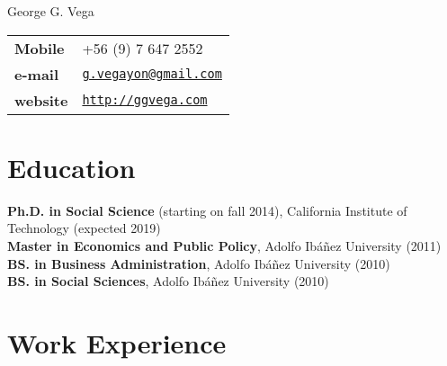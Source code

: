 \documentclass[letterpaper, 11pt]{article}
\def\name{George G. Vega}
\renewenvironment{itemize}{
  \begin{list}{}{
    \setlength{\leftmargin}{0.45cm}
  }
}{
  \end{list}
}
\begin{document}
{\huge \name}


\vspace{0.25in}

\begin{minipage}{0.45\linewidth}
  \begin{tabular}{>{\bfseries}p{4cm}l}
    Mobile & +56 (9) 7 647 2552 \\
    e-mail & \href{mailto:g.vegayon@gmail.com}{\tt g.vegayon@gmail.com} \\
    website & \href{http://ggvega.com}{\tt http://ggvega.com} \\
  \end{tabular}
\end{minipage}

%


\section*{Education}

\begin{itemize}
\item {\bf Ph.D. in Social Science} (starting on fall 2014), California Institute of Technology (expected 2019) \\
{\bf Master in Economics and Public Policy}, Adolfo Ib\'a\~nez University (2011) \\
{\bf BS. in Business Administration}, Adolfo Ib\'a\~nez University (2010) \\
{\bf BS. in Social Sciences}, Adolfo Ib\'a\~nez University (2010) 
\end{itemize}

\section*{Work Experience}
\end{document}
